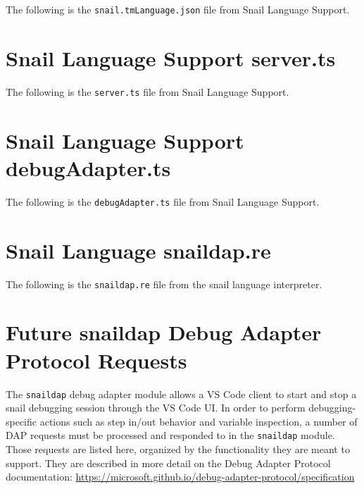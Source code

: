 \documentclass{article}
\begin{document}
\begin{appendices}
    The following is the \lstinline{snail.tmLanguage.json} file from Snail Language Support.
    
    \label{app:snail-tmLanguage}

\newpage
\section{Snail Language Support server.ts}

    The following is the \lstinline{server.ts} file from Snail Language Support.
    
    \label{app:server-ts}

\newpage
\section{Snail Language Support debugAdapter.ts}

    The following is the \lstinline{debugAdapter.ts} file from Snail Language Support.
    
    \label{app:debug-adapter-ts}

\newpage
\section{Snail Language snaildap.re}

    The following is the \lstinline{snaildap.re} file from the snail language interpreter.
    
    \label{app:snaildap}
    
\newpage
\section{Future snaildap Debug Adapter Protocol Requests} 

    The \lstinline{snaildap} debug adapter module allows a VS Code client to start and stop a snail debugging session through the VS Code UI. In order to perform debugging-specific actions such as step in/out behavior and variable inspection, a number of DAP requests must be processed and responded to in the \lstinline{snaildap} module. Those requests are listed here, organized by the functionality they are meant to support. They are described in more detail on the Debug Adapter Protocol documentation: \url{https://microsoft.github.io/debug-adapter-protocol/specification}


\end{appendices}
\end{document}
